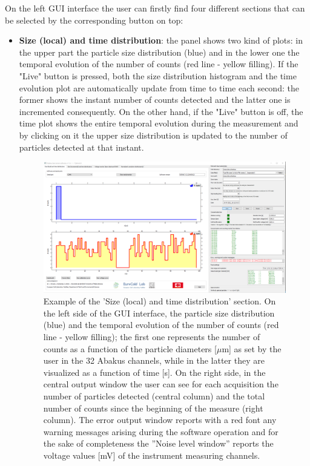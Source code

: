 \documentclass[a4paper, 11pt]{report}
\begin{document}
On the left GUI interface the user can firstly find four different sections that can be selected by the corresponding button on top:
\begin{itemize}
\item \textbf{Size (local) and time distribution}: the panel shows two kind of plots: in the upper part the particle size distribution (blue) and in the lower one the temporal evolution of the number of counts (red line - yellow filling).
If the "Live" button is pressed, both the size distribution histogram and the time evolution plot are automatically update from time to time each second: the former shows the instant number of counts detected and the latter one is incremented consequently.
On the other hand, if the "Live" button is off, the time plot shows the entire temporal evolution during the measurement and by clicking on it the upper size distribution is updated to the number of particles detected at that instant. \\
\begin{figure}[!hp]
	\centering
	\includegraphics[scale=0.3]{local_measure.png}	
	\caption{Example of the 'Size (local) and time distribution' section. On the left side of the GUI interface, the particle size distribution (blue) and the temporal evolution of the number of counts (red line - yellow filling); the first one represents the number of counts as a function of the particle diameters [$\mu$m] as set by the user in the 32 Abakus channels, while in the latter they are visualized as a function of time [s]. On the right side, in the central output window the user can see for each acquisition the number of particles detected (central column) and the total number of counts since the beginning of the measure (right column). The error output window reports with a red font any warning messages arising during the software operation and for the sake of completeness the ''Noise level window'' reports the voltage values [mV] of the instrument measuring channels.}
	\label{abakus_software1}
\end{figure}


\end{itemize}
\end{document}
